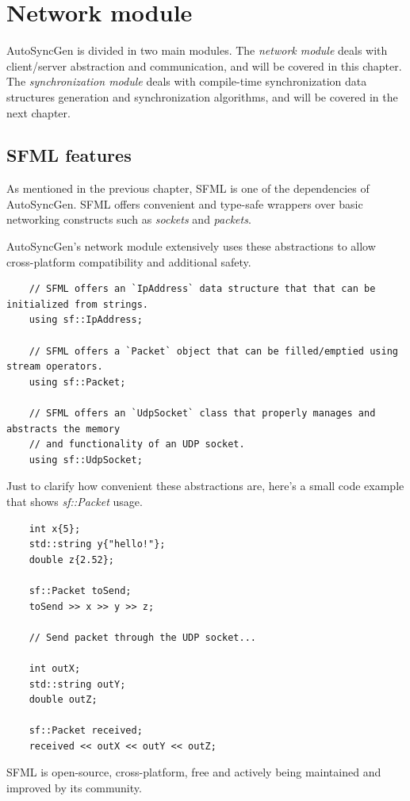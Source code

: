 \documentclass{report}
\def \cppStart {\begin{verbatim}}
\begin{document}
    \chapter{Network module}
        AutoSyncGen is divided in two main modules. 
        The \emph{network module} deals with client/server abstraction and communication, and will be covered in this chapter.
        The \emph{synchronization module} deals with compile-time synchronization data structures generation and synchronization algorithms, and will be covered in the next chapter.

        \section{SFML features}
            As mentioned in the previous chapter, SFML is one of the dependencies of AutoSyncGen. 
            SFML offers convenient and type-safe wrappers over basic networking constructs such as \emph{sockets} and \emph{packets}.

            AutoSyncGen's network module extensively uses these abstractions to allow cross-platform compatibility and additional safety.

            \cppStart
    // SFML offers an `IpAddress` data structure that that can be initialized from strings.
    using sf::IpAddress;
    
    // SFML offers a `Packet` object that can be filled/emptied using stream operators.
    using sf::Packet;

    // SFML offers an `UdpSocket` class that properly manages and abstracts the memory 
    // and functionality of an UDP socket.
    using sf::UdpSocket;
            \end{verbatim}

            Just to clarify how convenient these abstractions are, here's a small code example that shows \emph{sf::Packet} usage.

            \cppStart
    int x{5};
    std::string y{"hello!"};
    double z{2.52};

    sf::Packet toSend;
    toSend >> x >> y >> z;

    // Send packet through the UDP socket...

    int outX; 
    std::string outY;
    double outZ;
    
    sf::Packet received;
    received << outX << outY << outZ;
            \end{verbatim}

            SFML is open-source, cross-platform, free and actively being maintained and improved by its community.
\end{document}
